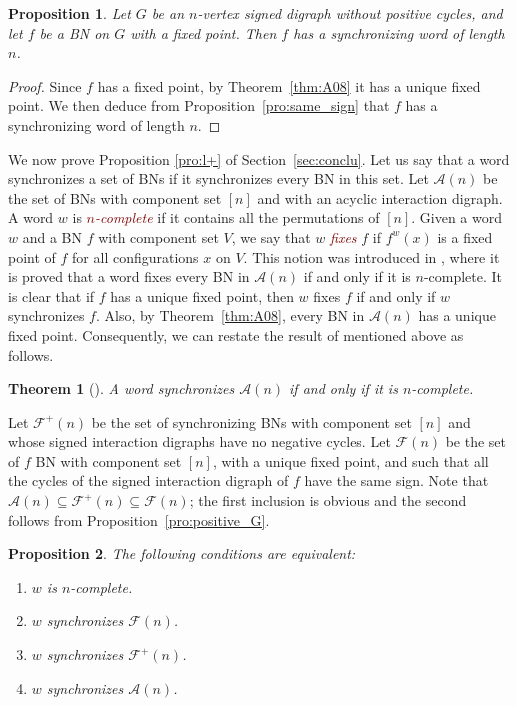 \documentclass[11pt,letter]{article}
\newtheorem{proposition}{Proposition}
\newtheorem{theorem}{Theorem}
\newcommand{\EM}[1]{{\em\textcolor{Maroon}{#1}}}
\begin{document}
\begin{proposition}\label{pro:negative_G}
Let $G$ be an $n$-vertex signed digraph without positive cycles, and let $f$ be a BN on $G$ with a fixed point. Then $f$ has a synchronizing word of length $n$. 
\end{proposition}

\begin{proof}
Since $f$ has a fixed point, by Theorem~\ref{thm:A08} it has a unique fixed point. We then deduce from Proposition~\ref{pro:same_sign} that $f$ has a synchronizing word of length $n$. 
\end{proof}

We now prove Proposition \ref{pro:l+} of Section~\ref{sec:conclu}.  Let us say that a word synchronizes a set of BNs if it synchronizes every BN in this set. Let $\mathcal{A}(n)$ be the set of BNs with component set $[n]$ and with an acyclic interaction digraph. A word $w$ is \EM{$n$-complete} if it contains all the permutations of $[n]$. Given a word $w$ and a BN $f$ with component set $V$, we say that $w$ \EM{fixes} $f$ if $f^w(x)$ is a fixed point of $f$ for all configurations $x$ on $V$. This notion was introduced in \cite{AGRS20}, where it is proved that a word fixes every BN in $\mathcal{A}(n)$ if and only if it is $n$-complete. It is clear that if $f$ has a unique fixed point, then $w$ fixes $f$ if and only if $w$ synchronizes $f$. Also, by Theorem~\ref{thm:A08}, every BN in $\mathcal{A}(n)$ has a unique fixed point. Consequently, we can restate the result of \cite{AGRS20} mentioned above as follows. 

\begin{theorem}[\cite{AGRS20}]\label{thm:n-complete}
A word synchronizes $\mathcal{A}(n)$ if and only if it is $n$-complete. 
\end{theorem}

Let $\mathcal{F}^+(n)$ be the set of synchronizing BNs with component set $[n]$ and whose signed interaction digraphs have no negative cycles. Let $\mathcal{F}(n)$ be the set of $f$ BN with component set $[n]$, with a unique fixed point, and such that all the cycles of the signed interaction digraph of $f$ have the same sign. Note that $\mathcal{A}(n)\subseteq \mathcal{F}^+(n)\subseteq \mathcal{F}(n)$; the first inclusion is obvious and the second follows from Proposition~\ref{pro:positive_G}. 

\begin{proposition}
The following conditions are equivalent:
\begin{enumerate}
\item $w$ is $n$-complete.
\item $w$ synchronizes $\mathcal{F}(n)$.
\item $w$ synchronizes $\mathcal{F}^+(n)$.
\item $w$ synchronizes $\mathcal{A}(n)$.
\end{enumerate}
\end{proposition}
\end{document}
